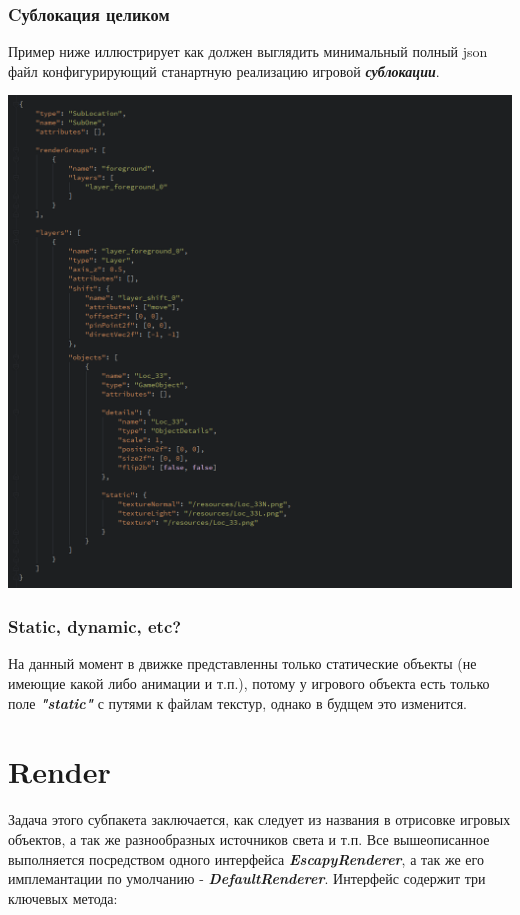 \documentclass[11pt]{report}
\begin{document}
\subsubsection{Cублокация целиком}
Пример ниже иллюстрирует как должен выглядить минимальный полный json файл конфигурирующий станартную реализацию игровой \textit{\textbf{сублокации}}.
\begin{center}
	\includegraphics[width=1.2\linewidth]{img/21.png} 
  	\label{img:210} 
\end{center} 

\subsubsection{Static, dynamic, etc?}
На данный момент в движке представленны только статические объекты (не имеющие какой либо анимации и т.п.), потому у игрового объекта есть только поле \textit{\textbf{"static"}} с путями к файлам текстур, однако в будщем это изменится.

\newpage
\section{Render}
Задача этого субпакета заключается, как следует из названия в отрисовке игровых объектов, а так же разнообразных источников света и т.п. Все вышеописанное выполняется посредством одного интерфейса \textit{\textbf{EscapyRenderer}}, а так же его имплемантации по умолчанию - \textit{\textbf{DefaultRenderer}}. Интерфейс содержит три ключевых метода:
\end{document}
